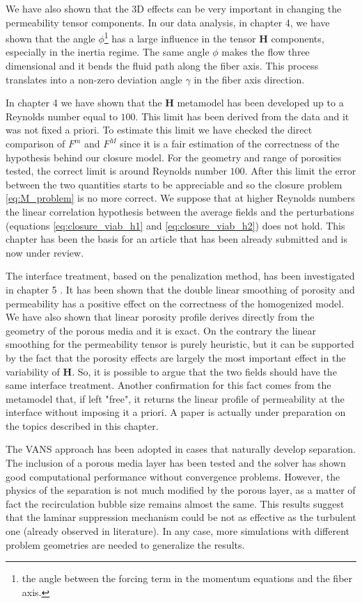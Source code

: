 We have also shown that the 3D effects can be very important in changing the permeability tensor components. In our data analysis, in chapter 4, we have shown that the angle $\phi$\footnote{the angle between the forcing term in the momentum equations and the fiber axis.} has a large influence in the tensor $\mathbf{H}$ components, especially in the inertia regime.
The same angle $\phi$ makes the flow three dimensional and it bends the fluid path along the fiber axis. This process translates into a non-zero deviation angle $\gamma$ in the fiber axis direction.

In chapter 4 \citep{luminari2018MF} we have shown that the $\mathbf{H}$ metamodel has been developed up to a Reynolds number equal to $100$. This limit has been derived from the data and it was not fixed a priori. To estimate this limit we have checked the direct comparison of $F^m$ and $F^M$ since it is a fair estimation of the correctness of the hypothesis behind our closure model. For the geometry and range of porosities tested, the correct limit is around Reynolds number $100$. After this limit the error between the two quantities starts to be appreciable and so the closure problem \eqref{eq:M_problem} is no more correct. We suppose that at higher Reynolds numbers the linear correlation hypothesis between the average fields and the perturbations (equations \eqref{eq:closure_viab_h1} and \eqref{eq:closure_viab_h2}) does not hold.
This chapter has been the basis for an article that has been already submitted and is now under review.

The interface treatment, based on the penalization method, has been investigated in chapter 5 \citep{luminari2018PM}. It has been shown that the double linear smoothing of porosity and permeability has a positive effect on the correctness of the homogenized model. We have also shown that linear porosity profile derives directly from the geometry of the porous media and it is exact. On the contrary the linear smoothing for the permeability tensor is purely heuristic, but it can be supported by the fact that the porosity effects are largely the most important effect in the variability of $\mathbf{H}$. So, it is possible to argue that the two fields should have the same interface treatment. Another confirmation for this fact comes from the metamodel that, if left "free", it returns the linear profile of permeability at the interface without imposing it a priori. A paper is actually under preparation on the topics described in this chapter.
 
The VANS approach has been adopted in cases that naturally develop separation. The inclusion of a porous media layer has been tested and the solver has shown good computational performance without convergence problems. However, the physics of the separation is not much modified by the porous layer, as a matter of fact the recirculation bubble size remains almost the same. This results suggest that the laminar suppression mechanism could be not as effective as the turbulent one (already observed in literature). In any case, more simulations with different problem geometries are needed to generalize the results.

